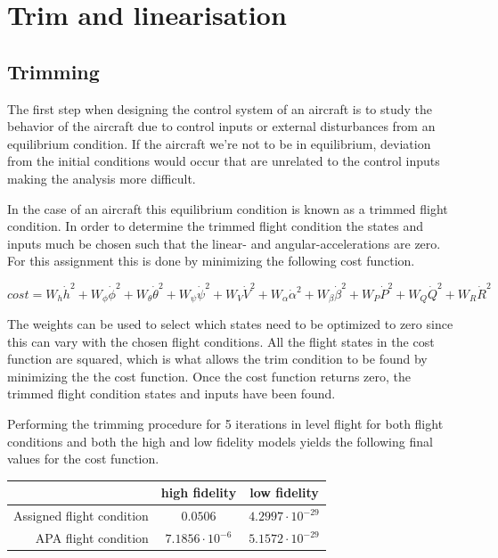 \section{Trim and linearisation}

\subsection{Trimming}
The first step when designing the control system of an aircraft is to study the behavior of the aircraft due to control inputs or external disturbances from an equilibrium condition. If the aircraft we're not to be in equilibrium, deviation from the initial conditions would occur that are unrelated to the control inputs making the analysis more difficult.

In the case of an aircraft this equilibrium condition is known as a trimmed flight condition. In order to determine the trimmed flight condition the states and inputs much be chosen such that the linear- and angular-accelerations are zero. For this assignment this is done by minimizing the following cost function.

\begin{equation}
    \label{eq:trim_cost}
    cost = W_{h}\dot{h}^2 + 
           W_{\phi}\dot{\phi}^2 +
           W_{\theta}\dot{\theta}^2 + 
           W_{\psi}\dot{\psi}^2 +
           W_{V}\dot{V}^2 + 
           W_{\alpha}\dot{\alpha}^2 + 
           W_{\beta}\dot{\beta}^2 + 
           W_{P}\dot{P}^2 +
           W_{Q}\dot{Q}^2 +
           W_{R}\dot{R}^2
\end{equation}

The weights can be used to select which states need to be optimized to zero since this can vary with the chosen flight conditions. All the flight states in the cost function are squared, which is what allows the trim condition to be found by minimizing the the cost function. Once the cost function returns zero, the trimmed flight condition states and inputs have been found.

Performing the trimming procedure for 5 iterations in level flight for both flight conditions and both the high and low fidelity models yields the following final values for the cost function.

\begin{center}
    \begin{tabular}{ r | c | c }
                               & high fidelity & low fidelity \\ \hline \hline
     Assigned flight condition & $0.0506$ & $4.2997\cdot10^{-29}$ \\  
     APA flight condition      & $7.1856\cdot10^{-6}$ & $5.1572\cdot10^{-29}$    
    \end{tabular}
\end{center}


